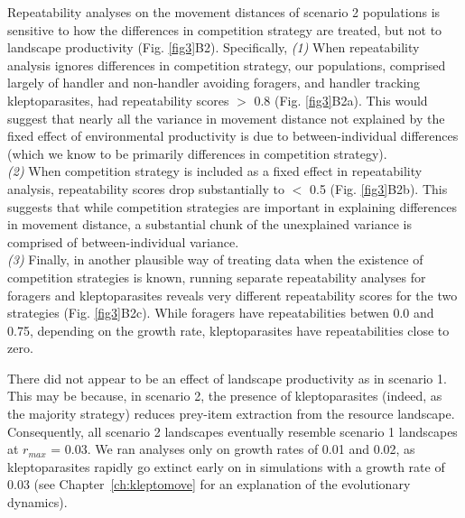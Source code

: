 Repeatability analyses on the movement distances of scenario 2 populations is sensitive to how the differences in competition strategy are treated, but not to landscape productivity (Fig. \ref{fig3}B2). Specifically,
\textit{(1)} When repeatability analysis ignores differences in competition strategy, our populations, comprised largely of handler and non-handler avoiding foragers, and handler tracking kleptoparasites, had repeatability scores $>$ 0.8 (Fig. \ref{fig3}B2a).
This would suggest that nearly all the variance in movement distance not explained by the fixed effect of environmental productivity is due to between-individual differences (which we know to be primarily differences in competition strategy).\\
\textit{(2)} When competition strategy is included as a fixed effect in repeatability analysis, repeatability scores drop substantially to $<$ 0.5 (Fig. \ref{fig3}B2b).
This suggests that while competition strategies are important in explaining differences in movement distance, a substantial chunk of the unexplained variance is comprised of between-individual variance.\\ 
\textit{(3)} Finally, in another plausible way of treating data when the existence of competition strategies is known, running separate repeatability analyses for foragers and kleptoparasites reveals very different repeatability scores for the two strategies (Fig. \ref{fig3}B2c).
While foragers have repeatabilities betwen 0.0 and 0.75, depending on the growth rate, kleptoparasites have repeatabilities close to zero.

There did not appear to be an effect of landscape productivity as in scenario 1.
This may be because, in scenario 2, the presence of kleptoparasites (indeed, as the majority strategy) reduces prey-item extraction from the resource landscape.
Consequently, all scenario 2 landscapes eventually resemble scenario 1 landscapes at $r_{max}$ = 0.03.
We ran analyses only on growth rates of 0.01 and 0.02, as kleptoparasites rapidly go extinct early on in simulations with a growth rate of 0.03 (see Chapter~\ref{ch:kleptomove} for an explanation of the evolutionary dynamics).

